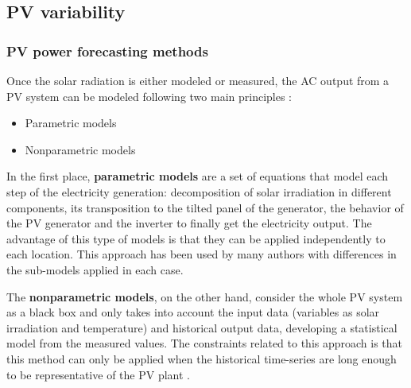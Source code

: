 

\subsection{PV variability}
\subsubsection{PV power forecasting methods}

Once the solar radiation is either modeled or measured, the AC output from a PV system can be modeled following two main principles \cite*{Almeida2015}:

\begin{itemize}
\item Parametric models
\item Nonparametric models
\end{itemize}

In the first place, \textbf{parametric models} are a set of equations that model each step of the electricity generation: decomposition of solar irradiation in different components, its transposition to the tilted panel of the generator, the behavior of the PV generator and the inverter to finally get the electricity output. The advantage of this type of models is that they can be applied independently to each location. This approach has been used by many authors \cite*{Bofinger2006, Lorenz2008, Lorenz2011} with differences in the sub-models applied in each case.

The \textbf{nonparametric models}, on the other hand, consider the whole PV system as a black box and only takes into account the input data (variables as solar irradiation and temperature) and historical output data, developing a statistical model from the measured values. The constraints related to this approach is that this method can only be applied when the historical time-series are long enough to be representative of the PV plant \cite*{bacher2009online}.

